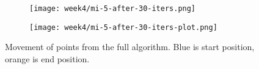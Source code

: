 \begin{figure}
  \centering
  \begin{subfigure}{0.45\textwidth}
    \texttt{[image: week4/mi-5-after-30-iters.png]}
  \end{subfigure}
  \begin{subfigure}{0.45\textwidth}
    \texttt{[image: week4/mi-5-after-30-iters-plot.png]}
  \end{subfigure}
  \caption{Movement of points from the full algorithm. Blue is start position, orange is end position.}
  \label{fig:mi-5-var}
\end{figure}



